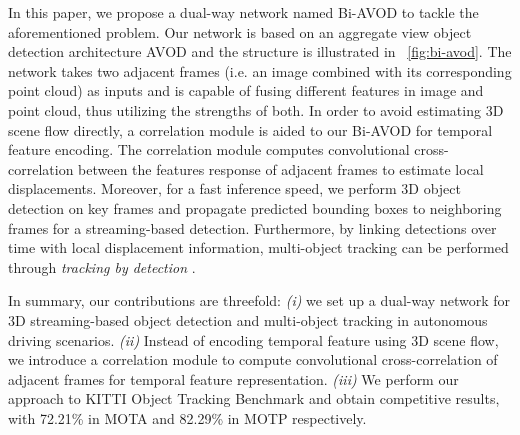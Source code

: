\documentclass{bmvc2k}
\begin{document}

In this paper, we propose a dual-way network named Bi-AVOD to tackle the aforementioned problem. Our network is based on an aggregate view object detection architecture AVOD \cite{ku2018joint} and the structure is illustrated in \figurename \, \ref{fig:bi-avod}. The network takes two adjacent frames (i.e. an image combined with its corresponding point cloud) as inputs and is capable of fusing different features in image and point cloud, thus utilizing the strengths of both. In order to avoid estimating 3D scene flow directly, a correlation module is aided to our Bi-AVOD for temporal feature encoding. The correlation module computes convolutional cross-correlation between the features response of adjacent frames to estimate local displacements. Moreover, for a fast inference speed, we perform 3D object detection on key frames and propagate predicted bounding boxes to neighboring frames for a streaming-based detection. Furthermore, by linking detections over time with local displacement information, multi-object tracking can be performed through \textit{tracking by detection} \cite{lenz2015followme}. 


In summary, our contributions are threefold: 
\textit{(i)} we set up a dual-way network for 3D streaming-based object detection and multi-object tracking in autonomous driving scenarios. \textit{(ii)} Instead of encoding temporal feature using 3D scene flow, we introduce a correlation module to compute convolutional cross-correlation of adjacent frames for temporal feature representation. \textit{(iii)} We perform our approach to KITTI Object Tracking Benchmark and obtain competitive results, with 72.21\% in MOTA and 82.29\% in MOTP respectively.
\end{document}
